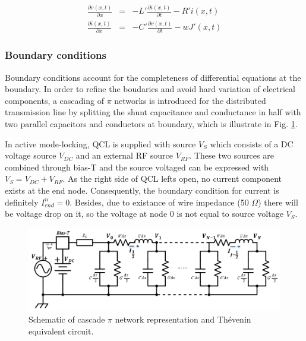 \documentclass[11pt,final]{scrbook}
\begin{document}
\begin{eqnarray}
\frac { \partial v(x,t) }{ \partial x }  &=& -L'\frac { \partial i(x,t) }{ \partial t }-R'i(x,t) \label{eq:TLequation3}\\
\frac { \partial i(x,t) }{ \partial x }  &=& - C'\frac { \partial v(x,t) }{ \partial t }-wJ'(x,t) \label{eq:TLequation4}
\end{eqnarray}

\subsubsection{Boundary conditions}
Boundary conditions account for the completeness of differential equations at the boundary. In order to refine the boudaries and avoid hard variation of electrical components, a cascading of $\pi$ networks\cite{orlandi1996fdtd} is introduced for the distributed transmission line by splitting the shunt capacitance and conductance in half with two parallel capacitors and conductors at boundary, which is illustrate in Fig. \ref{fig:BoundaryCondition}. 

In active mode-locking, QCL is supplied with source $ {V}_{S} $ which consists of a DC voltage source $ {V}_{DC} $ and an external RF source $ {V}_{RF} $. These two sources are combined through bias-T and the source voltaged can be expressed with $ {V}_{S}=V_{DC}+{V}_{RF} $. As the right side of QCL lefts open, no current component exists at the end node. Consequently, the boundary condition for current is definitely ${I}_{end}^{n} = 0$. Besides, due to existance of wire impedance (50 $\Omega$) there will be voltage drop on it, so the voltage at node 0 is not equal to source voltage $ {V}_{S} $.
\begin{figure}[htbp]
\begin{center}
\includegraphics[scale=0.55]{images/pi_representation}
\caption{Schematic of cascade $\pi$ network representation and Thévenin equivalent circuit.}
\label{fig:BoundaryCondition}
\end{center}
\end{figure}
\end{document}
